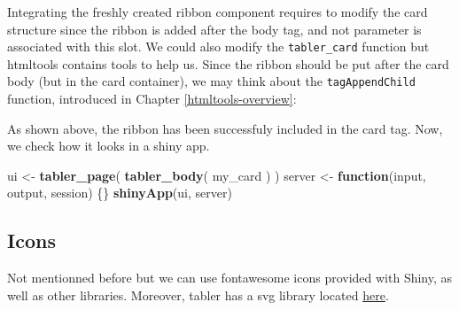 \documentclass[]{book}
\newenvironment{Shaded}{\begin{snugshade}}{\end{snugshade}}
\newcommand{\CommentTok}[1]{\textcolor[rgb]{0.56,0.35,0.01}{\textit{#1}}}
\newcommand{\ControlFlowTok}[1]{\textcolor[rgb]{0.13,0.29,0.53}{\textbf{#1}}}
\newcommand{\DataTypeTok}[1]{\textcolor[rgb]{0.13,0.29,0.53}{#1}}
\newcommand{\DecValTok}[1]{\textcolor[rgb]{0.00,0.00,0.81}{#1}}
\newcommand{\KeywordTok}[1]{\textcolor[rgb]{0.13,0.29,0.53}{\textbf{#1}}}
\newcommand{\NormalTok}[1]{#1}
\newcommand{\OperatorTok}[1]{\textcolor[rgb]{0.81,0.36,0.00}{\textbf{#1}}}
\newcommand{\OtherTok}[1]{\textcolor[rgb]{0.56,0.35,0.01}{#1}}
\newcommand{\StringTok}[1]{\textcolor[rgb]{0.31,0.60,0.02}{#1}}
\begin{document}
Integrating the freshly created ribbon component requires to modify the card structure since the ribbon is added after the body tag, and not parameter is associated with this slot. We could also modify the \texttt{tabler\_card} function but htmltools contains tools to help us. Since the ribbon should be put after the card body (but in the card container), we may think about the \texttt{tagAppendChild} function, introduced in Chapter \ref{htmltools-overview}:

\begin{Shaded}
\end{Shaded}

As shown above, the ribbon has been successfuly included in the card tag. Now, we check how it looks in a shiny app.

\begin{Shaded}
\begin{Highlighting}[]
\NormalTok{ui <-}\StringTok{ }\KeywordTok{tabler_page}\NormalTok{(}
  \KeywordTok{tabler_body}\NormalTok{(}
\NormalTok{    my_card}
\NormalTok{  )}
\NormalTok{)}
\NormalTok{server <-}\StringTok{ }\ControlFlowTok{function}\NormalTok{(input, output, session) \{\}}
\KeywordTok{shinyApp}\NormalTok{(ui, server)}
\end{Highlighting}
\end{Shaded}

\hypertarget{icons}{%
\subsection{Icons}\label{icons}}

Not mentionned before but we can use fontawesome icons provided with Shiny, as well as other libraries. Moreover, tabler has a svg library located \href{https://preview-dev.tabler.io/icons.html}{here}.
\end{document}
